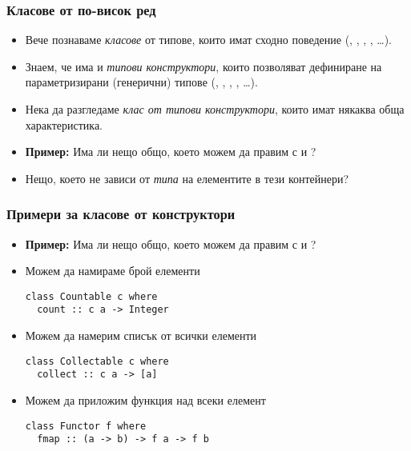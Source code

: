 \documentclass[alsotrans]{beamerswitch}
\begin{document}
\begin{frame}[fragile]
  \frametitle{Класове от по-висок ред}

  \begin{itemize}[<+->]
  \item Вече познаваме \emph{класове} от типове, които имат
    сходно поведение (, , , , \ldots).
  \item
    Знаем, че има и \emph{типови конструктори}, които позволяват дефиниране на параметризирани (генерични) типове (\lst{[]}, , , , \ldots).
  \item
    Нека да разгледаме \emph{клас от типови конструктори}, които имат някаква обща характеристика.
  \item
    \textbf{Пример:} Има ли нещо общо, което можем да правим с \lst{[]} и ?
  \item Нещо, което не зависи от \emph{типа} на елементите в тези контейнери?
  \end{itemize}
\end{frame}

\begin{frame}[fragile]
  \frametitle{Примери за класове от конструктори}
  \begin{itemize}[<+->]
  \item
    \textbf{Пример:} Има ли нещо общо, което можем да правим с \lst{[]} и ?
  \item Можем да намираме брой елементи
\begin{lstlisting}
class Countable c where
  count :: c a -> Integer
\end{lstlisting}
  \item Можем да намерим списък от всички елементи
\begin{lstlisting}
class Collectable c where
  collect :: c a -> [a]
\end{lstlisting}
  \item Можем да приложим функция над всеки елемент
\begin{lstlisting}
class Functor f where
  fmap :: (a -> b) -> f a -> f b
\end{lstlisting}
\end{itemize}
\end{frame}
\end{document}
